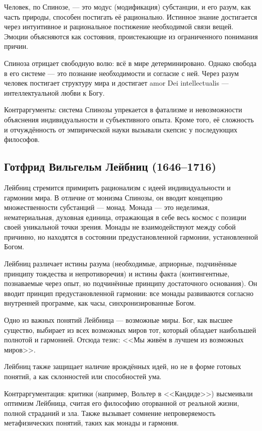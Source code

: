 \documentclass[12pt,a4paper]{article}
\begin{document}
	Человек, по Спинозе, — это модус (модификация) субстанции, и его разум, как часть природы, способен постигать её рационально. Истинное знание достигается через интуитивное и рациональное постижение необходимой связи вещей. Эмоции объясняются как состояния, проистекающие из ограниченного понимания причин.
	
	Спиноза отрицает свободную волю: всё в мире детерминировано. Однако свобода в его системе — это познание необходимости и согласие с ней. Через разум человек постигает структуру мира и достигает amor Dei intellectualis — интеллектуальной любви к Богу.
	
	Контраргументы: система Спинозы упрекается в фатализме и невозможности объяснения индивидуальности и субъективного опыта. Кроме того, её сложность и отчуждённость от эмпирической науки вызывали скепсис у последующих философов.
	
	\subsection{Готфрид Вильгельм Лейбниц (1646–1716)}
	Лейбниц стремится примирить рационализм с идеей индивидуальности и гармонии мира. В отличие от монизма Спинозы, он вводит концепцию множественности субстанций — монад. Монада — это неделимая, нематериальная, духовная единица, отражающая в себе весь космос с позиции своей уникальной точки зрения. Монады не взаимодействуют между собой причинно, но находятся в состоянии предустановленной гармонии, установленной Богом.
	
	Лейбниц различает истины разума (необходимые, априорные, подчинённые принципу тождества и непротиворечия) и истины факта (контингентные, познаваемые через опыт, но подчинённые принципу достаточного основания). Он вводит принцип предустановленной гармонии: все монады развиваются согласно внутренней программе, как часы, синхронизированные Богом.
	
	Одно из важных понятий Лейбница — возможные миры. Бог, как высшее существо, выбирает из всех возможных миров тот, который обладает наибольшей полнотой и гармонией. Отсюда тезис: <<Мы живём в лучшем из возможных миров>>.
	
	Лейбниц также защищает наличие врождённых идей, но не в форме готовых понятий, а как склонностей или способностей ума.
	
	Контраргументация: критики (например, Вольтер в <<Кандиде>>) высмеивали оптимизм Лейбница, считая его философию оторванной от реальной жизни, полной страданий и зла. Также вызывает сомнение непроверяемость метафизических понятий, таких как монады и гармония.
	
\end{document}

